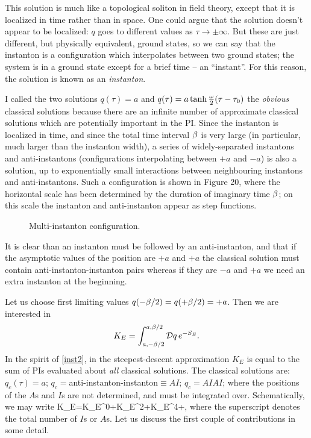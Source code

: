 \documentclass[12pt]{article}
\begin{document}
This solution is much like a topological soliton in field theory,
except that it is localized in time rather than in space.
One could argue that the solution doesn't
appear to be localized: $q$ goes to different values as
$\tau\to\pm\infty$. But these are just different, but physically
equivalent, ground states, so we can say that the instanton is a
configuration which interpolates between two ground states; the
system is in a ground state except for a brief time -- an
``instant''. For this reason, the solution is known
as an {\em instanton}.

I called the two solutions $q(\tau)=a$ and
$q(\tau)=a\tanh{{\omega}\over2}(\tau-\tau_0)$ the {\em obvious} classical
solutions because there are an infinite number of approximate
classical solutions which are potentially important in the PI. Since
the instanton is localized in time, and since the total time interval
${\beta}$ is very large (in particular,
much larger than the instanton width), a series of widely-separated
instantons and anti-instantons (configurations interpolating between
$+a$ and $-a$) is also a solution, up to exponentially small
interactions between neighbouring instantons and anti-instantons. Such
a configuration is shown in Figure 20, where the horizontal scale has
been determined by the duration of imaginary time ${\beta}$; on this
scale the instanton and anti-instanton appear as step
functions.

\begin{figure}[hb]
\epsfysize=5cm
\centerline{}
\caption{Multi-instanton configuration.}
\end{figure}


It is clear than an instanton must be followed by an anti-instanton,
and that if the asymptotic values of the position are $+a$ and $+a$
the classical solution must contain anti-instanton-instanton pairs
whereas if they are $-a$ and $+a$ we need an extra instanton at the
beginning.

Let us choose first limiting values $q(-{\beta}/2)=q(+{\beta}/2)=+a$. Then we
are interested in
\[
K_E=\int_{a,-\be/2}^{a,\be/2}\DD q\,e^{-S_E}.
\]
In the spirit of \eqref{inst2}, in the steepest-descent approximation
$K_E$ is equal to the sum of PIs evaluated about
{\em all} classical solutions. The classical solutions are:
$q_c(\tau)=a$;
$q_c=$anti-instanton-instanton$\equiv AI$; $q_c=AIAI$; \etcc where the
positions of the $A$s and $I$s are not determined, and must be
integrated over. Schematically, we may write
\beq
K_E=K_E^0+K_E^2+K_E^4+\cdots,
\label{new3}
\eeq
where the superscript denotes the
total number of $I$s or $A$s. Let us discuss the first couple of
contributions in some detail.
\end{document}

